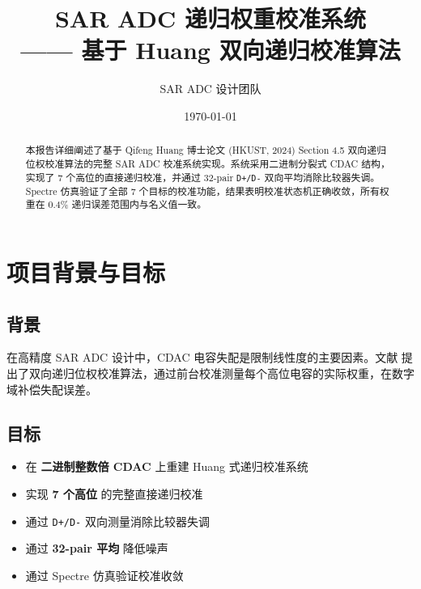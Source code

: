 \documentclass[12pt,a4paper]{article}
\begin{document}
\title{\vspace{-2cm}\textbf{SAR ADC 递归权重校准系统\\ \large —— 基于 Huang 双向递归校准算法}}
\author{SAR ADC 设计团队}
\date{\today}
\maketitle
\thispagestyle{empty}

\vspace{1cm}

\begin{abstract}
本报告详细阐述了基于 Qifeng Huang 博士论文 (HKUST, 2024) Section 4.5 双向递归位权校准算法的完整 SAR ADC 校准系统实现。系统采用二进制分裂式 CDAC 结构，实现了 7 个高位的直接递归校准，并通过 32-pair \texttt{D+/D-} 双向平均消除比较器失调。Spectre 仿真验证了全部 7 个目标的校准功能，结果表明校准状态机正确收敛，所有权重在 0.4\% 递归误差范围内与名义值一致。
\end{abstract}

\vspace{0.5cm}

\tableofcontents
\newpage

\section{项目背景与目标}

\subsection{背景}
在高精度 SAR ADC 设计中，CDAC 电容失配是限制线性度的主要因素。文献 \cite{huang2024} 提出了双向递归位权校准算法，通过前台校准测量每个高位电容的实际权重，在数字域补偿失配误差。

\subsection{目标}
\begin{itemize}
  \item 在 \textbf{二进制整数倍 CDAC} 上重建 Huang 式递归校准系统
  \item 实现 \textbf{7 个高位} 的完整直接递归校准
  \item 通过 \texttt{D+/D-} 双向测量消除比较器失调
  \item 通过 \textbf{32-pair 平均} 降低噪声
  \item 通过 Spectre 仿真验证校准收敛
\end{itemize}
\end{document}
